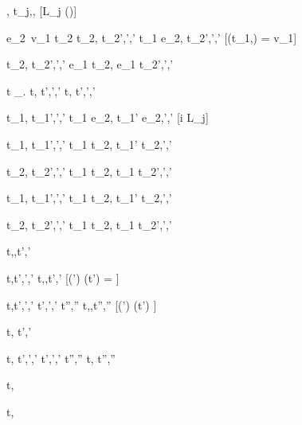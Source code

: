 
	{ }
	{\Pick{},\sigma {} t_j,\sigma,\nothing}
  [L_j \in \Picks(\Pick{})]



	{e_2\ v_1 \eval t_2 \Quad
   t_2,\sigma {} t_2',\sigma',\delta'}
  {t_1 \Step e_2,\sigma {} t_2',\sigma',\delta'}
  [\Value(t_1,\sigma) = v_1]



	{t_2,\sigma {} t_2',\sigma',\delta'}
	{e_1 \Trans t_2,\sigma {} e_1 \Trans t_2',\sigma',\delta'}

  {t \Step \lambda\_. \Forever t,\sigma {} t',\sigma',\delta'}
  {\Forever t,\sigma {} t',\sigma',\delta'}

  {t_1,\sigma {} t_1',\sigma',\delta'}
  {t_1 \Step e_2,\sigma {} t_1' \Step e_2,\sigma',\delta'}
  [i \neq \IContinue L_j]

  {t_1,\sigma {} t_1',\sigma',\delta'}
  {t_1 \Pair t_2,\sigma {} t_1' \Pair t_2,\sigma',\delta'}

  {t_2,\sigma {} t_2',\sigma',\delta'}
  {t_1 \Pair t_2,\sigma {} t_1 \Pair t_2',\sigma',\delta'}

  {t_1,\sigma {} t_1',\sigma',\delta'}
  {t_1 \Choose t_2,\sigma {} t_1' \Choose t_2,\sigma',\delta'}

  {t_2,\sigma {} t_2',\sigma',\delta'}
  {t_1 \Choose t_2,\sigma {} t_1 \Choose t_2',\sigma',\delta'}



  {t,\sigma,\delta \fix t',\sigma'}

  {t,\sigma \normalise t',\sigma',\delta'}
  {t,\sigma,\delta \fix t',\sigma'}
  [(\delta \cup \delta') \cap \Watching(t') = \nothing]

  {t,\sigma \normalise t',\sigma',\delta' \Quad
   t',\sigma',\delta' \fix t'',\sigma''}
  {t,\sigma,\delta \fix t'',\sigma''}
  [(\delta \cup \delta') \cap \Watching(t') \neq \nothing]


  {t,\sigma {} t',\sigma'}


  {t,\sigma {} t',\sigma',\delta' \Quad
   t',\sigma',\delta' \fix t'',\sigma''}
  {t,\sigma {} t'',\sigma''}



  {t,\sigma \extract {}}

  {t,\sigma \simulate {}}
